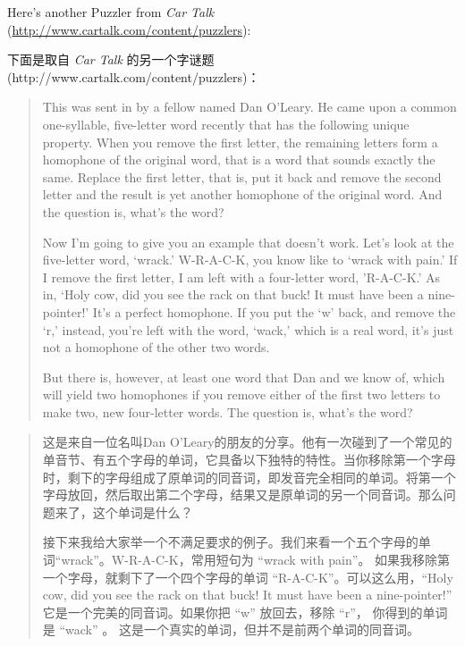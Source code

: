 \begin{exercise}

  

Here's another Puzzler from {\em Car Talk}
(\url{http://www.cartalk.com/content/puzzlers}):

下面是取自 {\em Car Talk} 的另一个字谜题(http://www.cartalk.com/content/puzzlers)：

\begin{quote}
This was sent in by a fellow named Dan O'Leary. He came upon a common
one-syllable, five-letter word recently that has the following unique
property. When you remove the first letter, the remaining letters form
a homophone of the original word, that is a word that sounds exactly
the same. Replace the first letter, that is, put it back and remove
the second letter and the result is yet another homophone of the
original word. And the question is, what's the word?

Now I'm going to give you an example that doesn't work. Let's look at
the five-letter word, `wrack.' W-R-A-C-K, you know like to `wrack with
pain.' If I remove the first letter, I am left with a four-letter
word, 'R-A-C-K.' As in, `Holy cow, did you see the rack on that buck!
It must have been a nine-pointer!' It's a perfect homophone. If you
put the `w' back, and remove the `r,' instead, you're left with the
word, `wack,' which is a real word, it's just not a homophone of the
other two words.

But there is, however, at least one word that Dan and we know of,
which will yield two homophones if you remove either of the first two
letters to make two, new four-letter words. The question is, what's
the word?
\end{quote}

\begin{quote}

这是来自一位名叫Dan O'Leary的朋友的分享。他有一次碰到了一个常见的单音节、有五个字母的单词，它具备以下独特的特性。当你移除第一个字母时，剩下的字母组成了原单词的同音词，即发音完全相同的单词。将第一个字母放回，然后取出第二个字母，结果又是原单词的另一个同音词。那么问题来了，这个单词是什么？

接下来我给大家举一个不满足要求的例子。我们来看一个五个字母的单词``wrack''。W-R-A-C-K，常用短句为 ``wrack with pain''。 如果我移除第一个字母，就剩下了一个四个字母的单词 ``R-A-C-K''。可以这么用，``Holy cow, did you see the rack on that buck! It must have been a nine-pointer!'' 它是一个完美的同音词。如果你把 ``w'' 放回去，移除 ``r''， 你得到的单词是 ``wack'' 。 这是一个真实的单词，但并不是前两个单词的同音词。


\end{quote}
\end{exercise}
